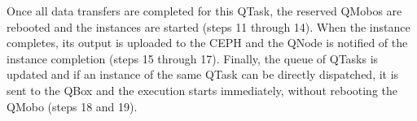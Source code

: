 Once all data transfers are completed for this QTask, the reserved QMobos are rebooted and the instances are started (steps 11 through 14). When the instance completes, its output is uploaded to the CEPH and the QNode is notified of the instance completion (steps 15 through 17).
Finally, the queue of QTasks is updated and if an instance of the same QTask can be directly dispatched, it is sent to the QBox and the execution starts immediately, without rebooting the QMobo (steps 18 and 19).



